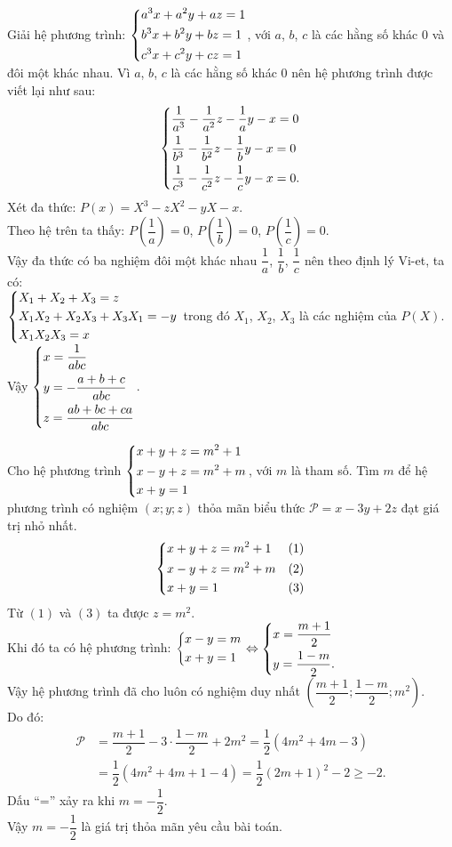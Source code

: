 \begin{ex}%
 Giải hệ phương trình: $\left\{\begin{aligned}& a^3x+a^2y+az=1 \\& b^3x+b^2y+bz=1 \\& c^3x+c^2y+cz=1\end{aligned}\right.$, với $a$, $b$, $c$ là các hằng số khác $0$ và đôi một khác nhau.
 \loigiai
  {
  Vì $a$, $b$, $c$ là các hằng số khác $0$ nên hệ phương trình được viết lại như sau:
  $$\left\{\begin{aligned}& \dfrac{1}{a^3} - \dfrac{1}{a^2}z - \dfrac{1}{a}y - x = 0 \\& \dfrac{1}{b^3} - \dfrac{1}{b^2}z - \dfrac{1}{b}y - x = 0 \\& \dfrac{1}{c^3} - \dfrac{1}{c^2}z - \dfrac{1}{c}y - x = 0 .\end{aligned}\right.$$
  Xét đa thức: $P(x) = X^3 - zX^2 - yX - x$.\\
  Theo hệ trên ta thấy: $P \left( \dfrac{1}{a} \right) = 0$, $P \left( \dfrac{1}{b} \right) = 0$, $P \left( \dfrac{1}{c} \right) = 0$.\\
  Vậy đa thức có ba nghiệm đôi một khác nhau $\dfrac{1}{a}$, $\dfrac{1}{b}$, $\dfrac{1}{c}$ nên theo định lý Vi-et, ta có:\\
  $\left\{\begin{aligned}& X_1 + X_2 + X_3 = z \\& X_1X_2 + X_2X_3 + X_3X_1 = -y \\& X_1X_2X_3 = x\end{aligned}\right.$ trong đó $X_1$, $X_2$, $X_3$ là các nghiệm của $P(X)$.\\
  Vậy $\left\{\begin{aligned}& x = \dfrac{1}{abc} \\& y = -\dfrac{a+b+c}{abc} \\& z = \dfrac{ab+bc+ca}{abc}\end{aligned}\right.$.
  }
\end{ex}


\begin{ex}%
 Cho hệ phương trình $\left\{\begin{aligned}& x+y+z=m^2+1 \\& x-y+z=m^2+m \\& x+y=1\end{aligned}\right.$, với $m$ là tham số. Tìm $m$ để hệ phương trình có nghiệm $(x;y;z)$ thỏa mãn biểu thức $\mathscr{P} = x - 3y + 2z$ đạt giá trị nhỏ nhất.
 \loigiai
  {
  $$\left\{\begin{aligned}& x+y+z=m^2+1 & (1) \\& x-y+z=m^2+m & (2) \\& x+y=1 & (3)\end{aligned}\right.$$
  Từ $(1)$ và $(3)$ ta được $z = m^2$.\\
  Khi đó ta có hệ phương trình: $\left\{\begin{aligned}& x-y=m \\& x+y=1\end{aligned}\right. \Leftrightarrow \left\{\begin{aligned}& x = \dfrac{m+1}{2} \\& y = \dfrac{1-m}{2}.\end{aligned}\right.$\\
  Vậy hệ phương trình đã cho luôn có nghiệm duy nhất $\left( \dfrac{m+1}{2}; \dfrac{1-m}{2}; m^2 \right)$.\\
  Do đó:
  \begin{align*}
   \mathscr{P} & = \dfrac{m+1}{2} - 3 \cdot \dfrac{1-m}{2} + 2m^2 = \dfrac{1}{2} \left( 4m^2 + 4m - 3 \right)\\
   & = \dfrac{1}{2} \left( 4m^2 + 4m + 1 -4 \right) = \dfrac{1}{2}(2m+1)^2 - 2 \geq -2.
  \end{align*}
  Dấu ``='' xảy ra khi $m = -\dfrac{1}{2}$.\\
  Vậy $m = -\dfrac{1}{2}$ là giá trị thỏa mãn yêu cầu bài toán.
  }
\end{ex}


